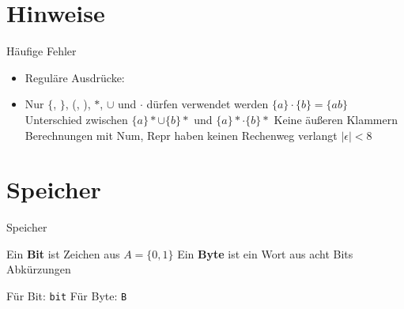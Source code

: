 \documentclass[handout]{beamer}
\begin{document}

\begin{frame}
	\titlepage
\end{frame}

\renewcommand{\ip}{} %


\section{Hinweise}

\begin{frame} {Häufige Fehler}
\begin{itemize}
	\item Reguläre Ausdrücke:
	\item Nur $\{$, $\}$, (, ), $*$, $\cup$ und $\cdot$ dürfen verwendet werden
	\pitem $\{a\} \cdot \{b\} = \{ab\}$
	\pitem Unterschied zwischen $\{a\}* \cup \{b\}*$ und $\{a\}* \cdot \{b\}*$
	\pitem Keine äußeren Klammern
	\pitem Berechnungen mit Num, Repr haben keinen Rechenweg verlangt
	\pitem $|\epsilon| < 8$
\end{itemize}
\end{frame}

\section{Speicher}

\begin{frame}{Speicher}
	\begin{itemize}
		\pitem Ein \textbf{Bit} ist Zeichen aus $A = \{0, 1\}$
		\pitem Ein \textbf{Byte} ist ein Wort aus acht Bits
		\pitem Abkürzungen
		\begin{itemize}
			\pitem Für Bit: \texttt{bit}
			\pitem Für Byte: \texttt{B}
		\end{itemize}
	\end{itemize}
\end{frame}
\end{document}
